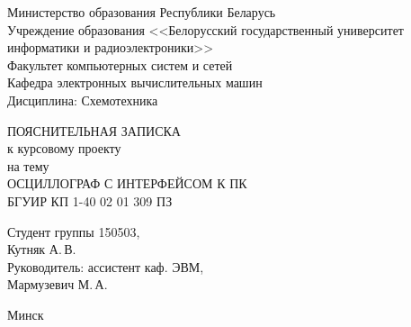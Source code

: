 \thispagestyle{empty}

\begin{center}
    Министерство образования Республики Беларусь\\[1em]
    Учреждение образования <<Белорусский государственный университет информатики и радиоэлектроники>>\\[2em]

    Факультет компьютерных систем и сетей\\[1em]
    Кафедра электронных вычислительных машин\\[1em]
    Дисциплина: Схемотехника

    \vfill
    
    ПОЯСНИТЕЛЬНАЯ ЗАПИСКА\\
    к курсовому проекту\\
    на тему\\[1em]
    \MakeUppercase{Осциллограф с интерфейсом к ПК}\\[1em]
    БГУИР КП 1-40 02 01 309 ПЗ\\

    \vfill
    
    \hfill\parbox{0.5\textwidth}{\raggedright 
    {
        Студент группы 150503,\\
        Кутняк А.\,В.\\
        \vspace{1em}  
        Руководитель: ассистент каф. ЭВМ,\\
        Мармузевич М.\,А.\\ 
    }}
    
    \vfill
    
    {\normalsize Минск \the\year}
\end{center}

\pagebreak %